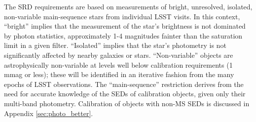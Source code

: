 \documentclass[12pt,preprint]{aastex}
\begin{document}
The SRD requirements are based on
measurements of bright, unresolved, isolated, non-variable main-sequence stars
from individual LSST visits. 
In this context, ``bright'' implies that the
measurement of the star's brightness is not dominated by photon
statistics, approximately 1-4 magnitudes fainter than the saturation
limit in a given filter. ``Isolated'' implies that the star's
photometry is not significantly affected by nearby galaxies or stars. 
``Non-variable'' objects are astrophysically non-variable at levels
well below calibration requirements (1 mmag or less); these will
be identified in an iterative fashion from the many epochs of LSST
observations.  The ``main-sequence'' restriction derives from the need
for accurate knowledge of the SEDs of calibration objects, given
only their multi-band photometry.  Calibration of objects with non-MS
SEDs is discussed in Appendix \ref{sec:photo_better}.
\end{document}
